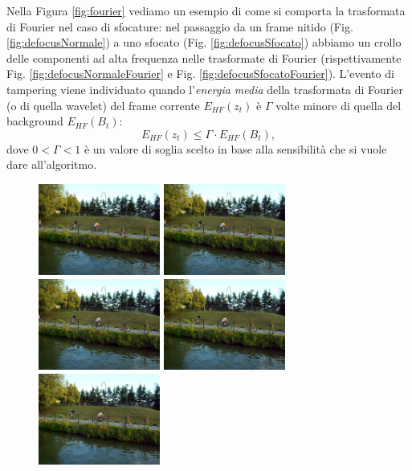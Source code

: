 Nella Figura \ref{fig:fourier} vediamo un esempio di come si comporta la trasformata di Fourier nel caso di sfocature: 
nel passaggio da un frame nitido (Fig. \ref{fig:defocusNormale}) a uno sfocato (Fig. \ref{fig:defocusSfocato}) abbiamo un crollo delle componenti ad alta frequenza nelle trasformate di Fourier (rispettivamente Fig. \ref{fig:defocusNormaleFourier} e Fig. \ref{fig:defocusSfocatoFourier}).
L'evento di tampering viene individuato quando l'\textit{energia media} della trasformata di Fourier (o di quella wavelet) del frame corrente $E_{HF}(z_t)$ \`e $\Gamma$ volte minore di quella del background $E_{HF}(B_t)$:
\[E_{HF}(z_t)\leq \Gamma \cdot E_{HF}(B_t),\]
dove $0<\Gamma<1$ \`e  un valore di soglia scelto in base alla sensibilit\`a che si vuole dare all'algoritmo.\\
\begin{figure}[tb]
	\centering
	\includegraphics[width = 4cm]{./pictures/FPSalto/img0001}
	\includegraphics[width = 4cm]{./pictures/FPSalto/img0002}
	\includegraphics[width = 4cm]{./pictures/FPSalto/img0003}
	\includegraphics[width = 4cm]{./pictures/FPSalto/img0004}
	\includegraphics[width = 4cm]{./pictures/FPSalto/img0005}

\end{figure}
